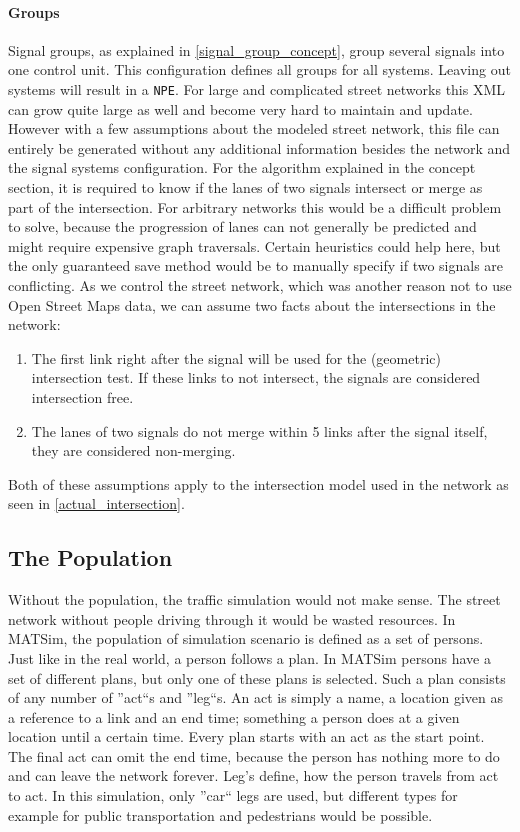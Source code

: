 \paragraph{Groups} Signal groups, as explained in \autoref{signal_group_concept}, group several signals into one control unit. This configuration defines all groups for all systems. Leaving out systems will result in a \texttt{NPE}. For large and complicated street networks this XML can grow quite large as well and become very hard to maintain and update. However with a few assumptions about the modeled street network, this file can entirely be generated without any additional information besides the network and the signal systems configuration. For the algorithm explained in the concept section, it is required to know if the lanes of two signals intersect or merge as part of the intersection. For arbitrary networks this would be a difficult problem to solve, because the progression of lanes can not generally be predicted and might require expensive graph traversals. Certain heuristics could help here, but the only guaranteed save method would be to manually specify if two signals are conflicting. As we control the street network, which was another reason not to use Open Street Maps data, we can assume two facts about the intersections in the network:

\begin{enumerate}
	\item The first link right after the signal will be used for the (geometric) intersection test. If these links to not intersect, the signals are considered intersection free.
	\item The lanes of two signals do not merge within 5 links after the signal itself, they are considered non-merging.
\end{enumerate}

Both of these assumptions apply to the intersection model used in the network as seen in \autoref{actual_intersection}.

\subsection*{The Population}

Without the population, the traffic simulation would not make sense. The street network without people driving through it would be wasted resources. In MATSim, the population of simulation scenario is defined as a set of persons. Just like in the real world, a person follows a plan. In MATSim persons have a set of different plans, but only one of these plans is selected. Such a plan consists of any number of ''act``s and ''leg``s. An act is simply a name, a location given as a reference to a link and an end time; something a person does at a given location until a certain time. Every plan starts with an act as the start point. The final act can omit the end time, because the person has nothing more to do and can leave the network forever. Leg's define, how the person travels from act to act. In this simulation, only ''car`` legs are used, but different types for example for public transportation and pedestrians would be possible.

